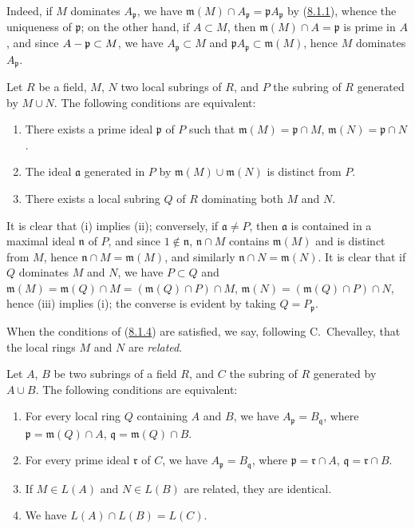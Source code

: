 Indeed, if $M$ dominates $A_\mathfrak p$, we have
$\mathfrak m(M)\cap A_\mathfrak p=\mathfrak p A_\mathfrak p$ by
(\hyperref[I.8.1.1]{8.1.1}), whence the uniqueness of $\mathfrak p$; on
the other hand, if $A\subset M$, then $\mathfrak m(M)\cap A=\mathfrak p$ is
prime in $A$, and since $A-\mathfrak p\subset M$, we have
$A_\mathfrak p\subset M$ and
$\mathfrak p A_\mathfrak p\subset\mathfrak m(M)$, hence $M$ dominates
$A_\mathfrak p$.

\begin{lemma}[8.1.4]
\label{I.8.1.4}
Let $R$ be a field, $M$, $N$ two local subrings of $R$, and $P$ the subring of
$R$ generated by $M\cup N$. The following conditions are equivalent:
\begin{enumerate}
  \item[\textup{(i)}] There exists a prime ideal $\mathfrak p$ of $P$ such that
    $\mathfrak m(M)=\mathfrak p\cap M$,
    $\mathfrak m(N)=\mathfrak p\cap N$.
  \item[\textup{(ii)}] The ideal $\mathfrak a$ generated in $P$ by
    $\mathfrak m(M)\cup\mathfrak m(N)$ is distinct from $P$.
  \item[\textup{(iii)}] There exists a local subring $Q$ of $R$ dominating both $M$
    and $N$.
\end{enumerate}
\end{lemma}

It is clear that (i) implies (ii); conversely, if $\mathfrak a\ne P$, then
$\mathfrak a$ is contained in a maximal ideal $\mathfrak n$ of $P$, and since
$1\notin\mathfrak n$, $\mathfrak n\cap M$ contains $\mathfrak m(M)$ and is
distinct from $M$, hence $\mathfrak n\cap M=\mathfrak m(M)$, and similarly
$\mathfrak n\cap N=\mathfrak m(N)$. It is clear that if $Q$ dominates $M$ and
$N$, we have $P\subset Q$ and $\mathfrak m(M)=\mathfrak m(Q)\cap M=(\mathfrak m(Q)\cap P)\cap M$,
$\mathfrak m(N)=(\mathfrak m(Q)\cap P)\cap N$,
hence (iii) implies (i); the converse is evident by taking
$Q=P_\mathfrak p$.

When the conditions of (\hyperref[I.8.1.4]{8.1.4}) are satisfied, we say,
following C.~Chevalley, that the local rings $M$ and $N$ are
\emph{related}.

\begin{proposition}[8.1.5]
\label{I.8.1.5}
Let $A$, $B$ be two subrings of a field $R$, and $C$ the subring of $R$
generated by $A\cup B$. The following conditions are equivalent:
\begin{enumerate}
  \item[\textup{(i)}] For every local ring $Q$ containing $A$ and $B$, we have
    $A_\mathfrak p=B_\mathfrak q$, where
    $\mathfrak p=\mathfrak m(Q)\cap A$,
    $\mathfrak q=\mathfrak m(Q)\cap B$.
  \item[\textup{(ii)}] For every prime ideal $\mathfrak r$ of $C$, we have
    $A_\mathfrak p=B_\mathfrak q$, where
    $\mathfrak p=\mathfrak r\cap A$, $\mathfrak q=\mathfrak r\cap B$.
  \item[\textup{(iii)}] If $M\in L(A)$ and $N\in L(B)$ are related, they are
    identical.
  \item[\textup{(iv)}] We have $L(A)\cap L(B)=L(C)$.
\end{enumerate}
\end{proposition}

